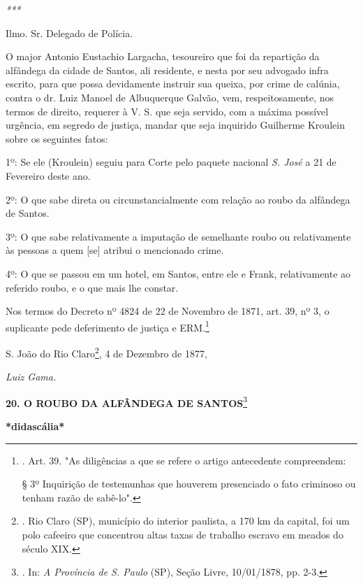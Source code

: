 \emph{***}

Ilmo. Sr. Delegado de Polícia.

O major Antonio Eustachio Largacha, tesoureiro que foi da repartição da
alfândega da cidade de Santos, ali residente, e nesta por seu advogado
infra escrito, para que possa devidamente instruir sua queixa, por crime
de calúnia, contra o dr. Luiz Manoel de Albuquerque Galvão, vem,
respeitosamente, nos termos de direito, requerer à V. S. que seja
servido, com a máxima possível urgência, em segredo de justiça, mandar
que seja inquirido Guilherme Kroulein sobre os seguintes fatos:

1º: Se ele (Kroulein) seguiu para Corte pelo paquete nacional \emph{S.
José} a 21 de Fevereiro deste ano.

2º: O que sabe direta ou circunstancialmente com relação ao roubo da
alfândega de Santos.

3º: O que sabe relativamente a imputação de semelhante roubo ou
relativamente às pessoas a quem {[}se{]} atribui o mencionado crime.

4º: O que se passou em um hotel, em Santos, entre ele e Frank,
relativamente ao referido roubo, e o que mais lhe constar.

Nos termos do Decreto nº 4824 de 22 de Novembro de 1871, art. 39, nº 3,
o suplicante pede deferimento de justiça e ERM.\footnote{. Art. 39. "As
  diligências a que se refere o artigo antecedente compreendem:

  § 3º Inquirição de testemunhas que houverem presenciado o fato
  criminoso ou tenham razão de sabê-lo".}

S. João do Rio Claro\footnote{. Rio Claro (SP), município do interior
  paulista, a 170 km da capital, foi um polo cafeeiro que concentrou
  altas taxas de trabalho escravo em meados do século XIX.},
\protect\hypertarget{Secao_Sem_Titulo-27}{}{}4 de Dezembro de 1877,

\emph{Luiz Gama.}

\textbf{20. O ROUBO DA ALFÂNDEGA DE SANTOS}\footnote{. In: \emph{A
  Província de S. Paulo} (SP), Seção Livre, 10/01/1878, pp. 2-3.}

\textbf{*didascália*}

